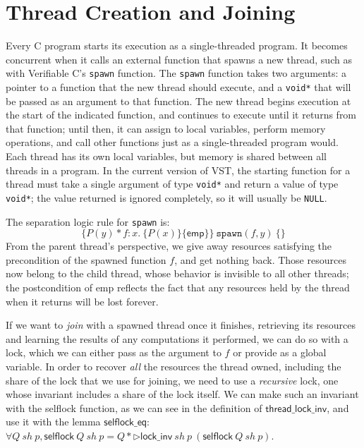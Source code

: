 \documentclass[11pt]{article} %
\begin{document}
\section{Thread Creation and Joining}
Every C program starts its execution as a single-threaded program. It becomes concurrent when it calls an external function that spawns a new thread, such as with Verifiable C's \texttt{spawn} function. The \texttt{spawn} function takes two arguments: a pointer to a function that the new thread should execute, and a \texttt{void*} that will be passed as an argument to that function. The new thread begins execution at the start of the indicated function, and continues to execute until it returns from that function; until then, it can assign to local variables, perform memory operations, and call other functions just as a single-threaded program would. Each thread has its own local variables, but memory is shared between all threads in a program. In the current version of VST, the starting function for a thread must take a single argument of type \texttt{void*} and return a value of type \texttt{void*}; the value returned is ignored completely, so it will usually be \texttt{NULL}.

The separation logic rule for \texttt{spawn} is:
$$\{P(y) * f : x.\ \{P(x)\}\{\mathsf{emp}\}\}\ \texttt{spawn}(f, y)\ \{\}$$
From the parent thread's perspective, we give away resources satisfying the precondition of the spawned function $f$, and get nothing back. Those resources now belong to the child thread, whose behavior is invisible to all other threads; the postcondition of \textsf{emp} reflects the fact that any resources held by the thread when it returns will be lost forever.

If we want to \emph{join} with a spawned thread once it finishes, retrieving its resources and learning the results of any computations it performed, we can do so with a lock, which we can either pass as the argument to $f$ or provide as a global variable. In order to recover \emph{all} the resources the thread owned, including the share of the lock that we use for joining, we need to use a \emph{recursive} lock, one whose invariant includes a share of the lock itself. We can make such an invariant with the \textsf{selflock} function, as we can see in the definition of $\mathsf{thread\_lock\_inv}$, and use it with the lemma $\mathsf{selflock\_eq}$: $\forall Q\ \mathit{sh}\ p, \mathsf{selflock}\ Q\ \mathit{sh}\ p = Q * \triangleright \mathsf{lock\_inv}\ \mathit{sh}\ p\ (\mathsf{selflock}\ Q\ \mathit{sh}\ p)$. 
\end{document}

